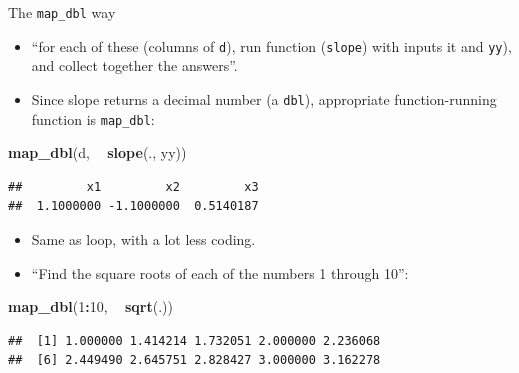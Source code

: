 \documentclass[
  ignorenonframetext,
]{beamer}
\newenvironment{Shaded}{\begin{snugshade}}{\end{snugshade}}
\newcommand{\DecValTok}[1]{\textcolor[rgb]{0.00,0.00,0.81}{#1}}
\newcommand{\KeywordTok}[1]{\textcolor[rgb]{0.13,0.29,0.53}{\textbf{#1}}}
\newcommand{\NormalTok}[1]{#1}
\newcommand{\OperatorTok}[1]{\textcolor[rgb]{0.81,0.36,0.00}{\textbf{#1}}}
\newcommand{\StringTok}[1]{\textcolor[rgb]{0.31,0.60,0.02}{#1}}
\providecommand{\tightlist}{%
  \setlength{\itemsep}{0pt}\setlength{\parskip}{0pt}}
\begin{document}
\begin{frame}[fragile]{The \texttt{map\_dbl} way}
\protect\hypertarget{the-map_dbl-way}{}

\begin{itemize}
\tightlist
\item
  ``for each of these (columns of \texttt{d}), run function
  (\texttt{slope}) with inputs it and \texttt{yy}), and collect together
  the answers''.
\item
  Since slope returns a decimal number (a \texttt{dbl}), appropriate
  function-running function is \texttt{map\_dbl}:
\end{itemize}

\begin{Shaded}
\begin{Highlighting}[]
\KeywordTok{map_dbl}\NormalTok{(d, }\OperatorTok{~}\StringTok{ }\KeywordTok{slope}\NormalTok{(., yy))}
\end{Highlighting}
\end{Shaded}

\begin{verbatim}
##         x1         x2         x3 
##  1.1000000 -1.1000000  0.5140187
\end{verbatim}

\begin{itemize}
\tightlist
\item
  Same as loop, with a lot less coding.
\item
  ``Find the square roots of each of the numbers 1 through 10'':
\end{itemize}

\begin{Shaded}
\begin{Highlighting}[]
\KeywordTok{map_dbl}\NormalTok{(}\DecValTok{1}\OperatorTok{:}\DecValTok{10}\NormalTok{, }\OperatorTok{~}\StringTok{ }\KeywordTok{sqrt}\NormalTok{(.))}
\end{Highlighting}
\end{Shaded}

\begin{verbatim}
##  [1] 1.000000 1.414214 1.732051 2.000000 2.236068
##  [6] 2.449490 2.645751 2.828427 3.000000 3.162278
\end{verbatim}

\end{frame}
\end{document}
